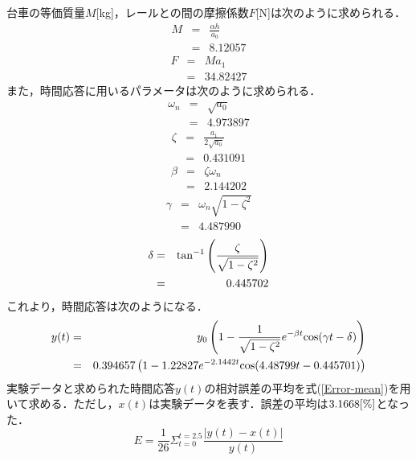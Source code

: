 \documentclass[12pt]{jsarticle}
\begin{document}
台車の等価質量$M$[kg]，レールとの間の摩擦係数$F$[N]は次のように求められる．
\begin{eqnarray}
  \label{StepResponse_calculate_M}
  M &=& \frac{\alpha h}{a_0} \\
    &=& 8.12057 \nonumber
\end{eqnarray}
\begin{eqnarray}
  \label{StepResponse_calculate_F}
  F &=& M a_1\\
    &=& 34.82427 \nonumber
\end{eqnarray}
また，時間応答に用いるパラメータは次のように求められる．
\begin{eqnarray}
  \label{StepResponse_calculate_omega_n}
  \omega_n &=& \sqrt{a_0} \\
           &=& 4.973897 \nonumber
\end{eqnarray}
\begin{eqnarray}
  \label{StepResponse_calculate_zeta}
  \zeta &=& \frac{a_1}{2\sqrt{a_0}} \\
        &=& 0.431091 \nonumber
\end{eqnarray}
\begin{eqnarray}
  \label{StepResponse_calculate_beta}
  \beta &=& \zeta \omega_n \\
        &=& 2.144202 \nonumber
\end{eqnarray}
\begin{eqnarray}
  \label{StepResponse_calculate_gamma}
  \gamma &=& \omega_n\sqrt{1-\zeta^2} \\
         &=& 4.487990 \nonumber
\end{eqnarray}
\begin{eqnarray}
  \label{StepResponse_calculate_delta}
  \delta &=& {\rm tan}^{-1}\left(\frac{\zeta}{\sqrt{1-\zeta^2}}\right) \\
         &=& 0.445702 \nonumber
\end{eqnarray}
これより，時間応答は次のようになる．
\begin{eqnarray}
  \label{Response_y_t}
  y(t) &=& y_0\left(1 - \frac{1}{\sqrt{1-\zeta^2}}e^{-\beta t}{\rm cos}(\gamma t - \delta)\right) \\
       &=& 0.394657\left(1 - 1.22827e^{-2.1442 t}{\rm cos}(4.48799 t - 0.445701)\right) \nonumber
\end{eqnarray}
実験データと求められた時間応答$y(t)$の相対誤差の平均を式(\ref{Error-mean})を用いて求める．ただし，$x(t)$は実験データを表す．誤差の平均は$3.1668{\rm [\%]}$となった．
\begin{equation}
  \label{Error-mean}
  E = \frac{1}{26}\Sigma_{t=0}^{t=2.5}\frac{|y(t) - x(t)|}{y(t)}
\end{equation}
\end{document}
